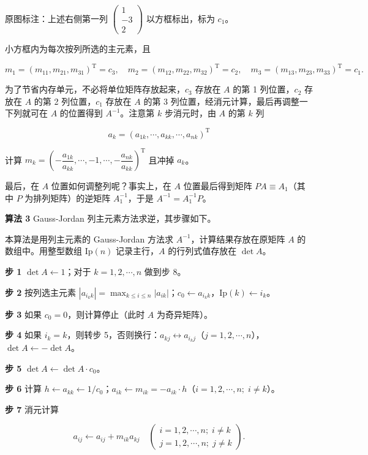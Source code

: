 \documentclass[
  10pt,
  fontset=fandol]{ctexart}
\begin{document}
原图标注：上述右侧第一列 \(\begin{pmatrix}1\\-3\\2\end{pmatrix}\) 以方框标出，标为 \(c_1\)。

小方框内为每次按列所选的主元素，且

\[m_1=(m_{11},m_{21},m_{31})^{\mathrm T}=c_3,\quad
m_2=(m_{12},m_{22},m_{32})^{\mathrm T}=c_2,\quad
m_3=(m_{13},m_{23},m_{33})^{\mathrm T}=c_1.\]

为了节省内存单元，不必将单位矩阵存放起来，\(c_3\) 存放在 \(A\) 的第 1 列位置，\(c_2\) 存放在 \(A\) 的第 2 列位置，\(c_1\) 存放在 \(A\) 的第 3 列位置，经消元计算，最后再调整一下列就可在 \(A\) 的位置得到 \(A^{-1}\)。注意第 \(k\) 步消元时，由 \(A\) 的第 \(k\) 列

\[a_k=(a_{1k},\cdots,a_{kk},\cdots,a_{nk})^{\mathrm T}\]

计算 \(m_k=\left(-\dfrac{a_{1k}}{a_{kk}},\cdots,-1,\cdots,-\dfrac{a_{nk}}{a_{kk}}\right)^{\mathrm T}\) 且冲掉 \(a_k\)。

最后，在 \(A\) 位置如何调整列呢？事实上，在 \(A\) 位置最后得到矩阵 \(PA\equiv A_1\)（其中 \(P\) 为排列矩阵）的逆矩阵 \(A_1^{-1}\)，于是 \(A^{-1}=A_1^{-1}P\)。

\textbf{算法 3} Gauss-Jordan 列主元素方法求逆，其步骤如下。

本算法是用列主元素的 Gauss-Jordan 方法求 \(A^{-1}\)，计算结果存放在原矩阵 \(A\) 的数组中。用整型数组 \(\mathrm{Ip}(n)\) 记录主行，\(A\) 的行列式值存放在 \(\det A\)。

\textbf{步 1} \(\det A\leftarrow1\)；对于 \(k=1,2,\cdots,n\) 做到步 8。

\textbf{步 2} 按列选主元素 \(|a_{i_kk}|=\max_{k\le i\le n}|a_{ik}|\)；\(c_0\leftarrow a_{i_kk}\)，\(\mathrm{Ip}(k)\leftarrow i_k\)。

\textbf{步 3} 如果 \(c_0=0\)，则计算停止（此时 \(A\) 为奇异矩阵）。

\textbf{步 4} 如果 \(i_k=k\)，则转步 5，否则换行：\(a_{kj}\leftrightarrow a_{i_kj}\)（\(j=1,2,\cdots,n\)），\(\det A\leftarrow-\det A\)。

\textbf{步 5} \(\det A\leftarrow\det A\cdot c_0\)。

\textbf{步 6} 计算 \(h\leftarrow a_{kk}\leftarrow1/c_0\)；\(a_{ik}\leftarrow m_{ik}=-a_{ik}\cdot h\)（\(i=1,2,\cdots,n;\;i\ne k\)）。

\textbf{步 7} 消元计算

\[a_{ij}\leftarrow a_{ij}+m_{ik}a_{kj}\quad
\left(\begin{array}{l}i=1,2,\cdots,n;\;i\ne k\\j=1,2,\cdots,n;\;j\ne k\end{array}\right).\]
\end{document}
